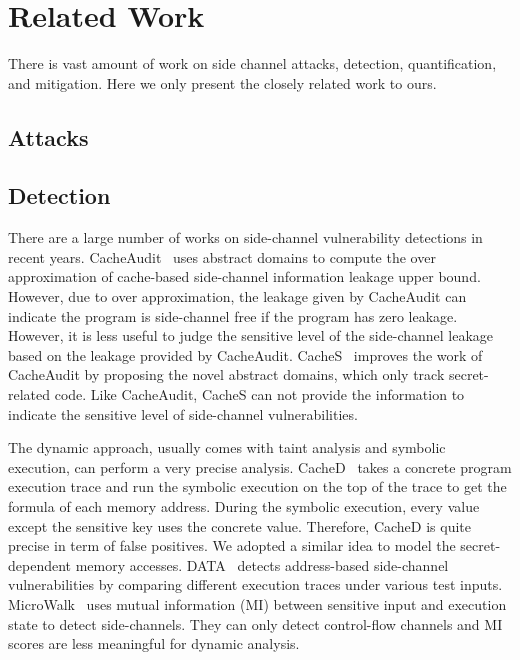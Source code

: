 \section{Related Work}

There is vast amount of work on side channel attacks, detection,
quantification, and mitigation. Here we only present the closely
related work to ours.

\subsection{Attacks}

\subsection{Detection}

There are a large number of works on side-channel vulnerability
detections in recent years.  CacheAudit~\cite{182946} uses abstract
domains to compute the over approximation of cache-based side-channel
information leakage upper bound. However, due to over approximation,
the leakage given by CacheAudit can indicate the program is
side-channel free if the program has zero leakage.  However, it is
less useful to judge the sensitive level of the side-channel leakage
based on the leakage provided by CacheAudit. CacheS~\cite{236338}
improves the work of CacheAudit by proposing the novel abstract
domains, which only track secret-related code. Like CacheAudit, CacheS
can not provide the information to indicate the sensitive level of
side-channel vulnerabilities.

The dynamic approach, usually comes with taint analysis and symbolic
execution, can perform a very precise analysis. CacheD~\cite{203878}
takes a concrete program execution trace and run the symbolic
execution on the top of the trace to get the formula of each memory
address. During the symbolic execution, every value except the
sensitive key uses the concrete value. Therefore, CacheD is quite
precise in term of false positives. We adopted a similar idea to model
the secret-dependent memory accesses. DATA~\cite{217537} detects
address-based side-channel vulnerabilities by comparing different
execution traces under various test
inputs. MicroWalk~\cite{Wichelmann:2018:MFF:3274694.3274741} uses
mutual information (MI) between sensitive input and execution state to
detect side-channels. They can only detect control-flow channels and
MI scores are less meaningful for dynamic analysis.


